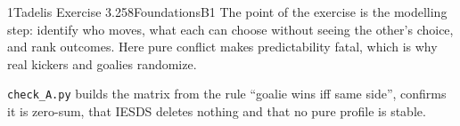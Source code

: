 \begin{exsol}{1}{Tadelis Exercise 3.2}{58}{Foundations}{B1}
\interp The point of the exercise is the modelling step: identify who moves, what each can
choose without seeing the other's choice, and rank outcomes. Here pure conflict makes
predictability fatal, which is why real kickers and goalies randomize.

\verify \texttt{check\_A.py} builds the matrix from the rule ``goalie wins iff same side'',
confirms it is zero-sum, that IESDS deletes nothing and that no pure profile is stable.

\end{exsol}
